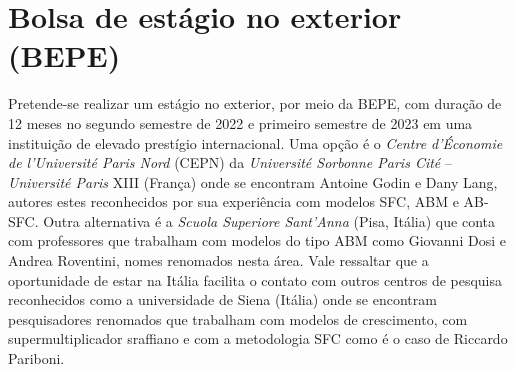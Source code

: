 \section{Bolsa de estágio no exterior (BEPE)}\label{BEPE}

Pretende-se realizar um estágio no exterior, por meio da BEPE, com duração de 12 meses no segundo semestre de 2022 e
primeiro semestre de 2023 em uma instituição de elevado prestígio internacional. 
Uma opção é o \textit{Centre d’Économie de l’Université Paris Nord} (CEPN) da \textit{Université Sorbonne Paris Cité} -- \textit{Université Paris} XIII (França) onde se encontram Antoine Godin e Dany Lang, autores estes reconhecidos por sua experiência com modelos  SFC, ABM e AB-SFC.
Outra alternativa é a \textit{Scuola Superiore Sant'Anna} (Pisa, Itália) que conta com professores que trabalham com modelos do tipo ABM como Giovanni Dosi e Andrea Roventini, nomes renomados nesta área.
Vale ressaltar que a oportunidade de estar na Itália facilita o contato com outros centros de pesquisa reconhecidos como a universidade de Siena (Itália) onde se encontram pesquisadores renomados que trabalham com modelos de crescimento, com supermultiplicador sraffiano e com a metodologia SFC como é o caso de Riccardo Pariboni.



